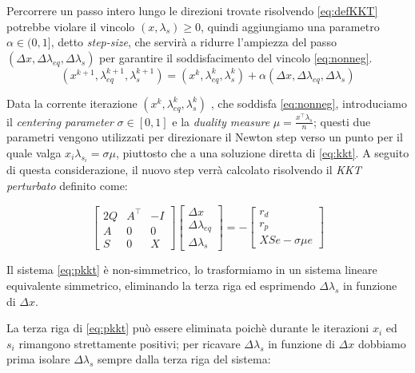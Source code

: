 Percorrere un passo intero lungo le direzioni trovate risolvendo \ref{eq:defKKT} potrebbe violare il vincolo $(x, \lambda_s)\geq 0$, 
quindi aggiungiamo una parametro $\alpha \in (0,1]$, detto \textit{step-size}, che servirà a ridurre l'ampiezza
 del passo $(\Delta x, \Delta \lambda_{eq},\Delta \lambda_s)$  per garantire il soddisfacimento del vincolo \ref{eq:nonneg}.
 \begin{equation} \label{eq:stepsize}
    (x^{k+1}, \lambda_{eq}^{k+1}, \lambda_{s}^{k+1}) = (x^k, \lambda_{eq}^k, \lambda_{s}^k) + \alpha (\Delta x, \Delta \lambda_{eq}, \Delta\lambda_s) 
 \end{equation}
 
 Data la corrente iterazione $(x^k, \lambda_{eq}^k, \lambda_{s}^k)$
 , che soddisfa \ref{eq:nonneg}, introduciamo il \textit{centering parameter} $\sigma \in[0,1]$ e la \textit{duality measure} $\mu = \frac{x^\intercal \lambda_s}{n}$; questi due parametri vengono utilizzati per direzionare il Newton step verso un punto per il quale valga $x_i \lambda_{s_i} = \sigma\mu $, piuttosto che a una soluzione diretta di \ref{eq:kkt}.
 A seguito di questa considerazione, il nuovo step verrà calcolato risolvendo il \textit{KKT perturbato} definito come:
 
 \begin{equation} \label{eq:pkkt}
\begin{bmatrix}
2Q & A^\intercal & -I\\
A & 0 & 0 \\
S & 0 & X
\end{bmatrix}\begin{bmatrix}\Delta x \\ \Delta \lambda_{eq} \\ \Delta \lambda_{s} \end{bmatrix}= -
\begin{bmatrix}
    r_d\\r_p\\XSe - \sigma\mu e
\end{bmatrix}
\end{equation}

Il sistema \ref{eq:pkkt} è non-simmetrico, lo trasformiamo in un sistema lineare equivalente simmetrico, eliminando la terza riga ed esprimendo $\Delta \lambda_s$ in funzione di $\Delta x$.

La terza riga di \ref{eq:pkkt} può essere eliminata poichè durante le iterazioni $x_i$ ed $s_i$ rimangono strettamente positivi; per ricavare $\Delta \lambda_s$ in funzione di $\Delta x$ dobbiamo prima isolare $\Delta \lambda_s$ sempre dalla terza riga del sistema:


